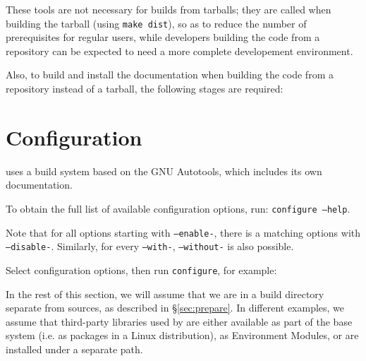 \documentclass[a4paper,10pt,twoside]{csshortdoc}
\begin{document}
These tools are not necessary for builds from tarballs; they
are called when building the tarball (using {\tt make dist}), so
as to reduce the number of prerequisites for regular users, while
developers building the code from a repository can be expected to
need a more complete developement environment.

Also, to build and install the documentation when building the code
from a repository instead of a tarball, the following stages are required:


\section{Configuration\label{sec:config}}

\CS uses a build system based on the GNU Autotools, which includes
its own documentation.

To obtain the full list of available configuration options,
run: {\tt configure~--help}.

Note that for all options starting with {\tt --enable-},
there is a matching options with {\tt --disable-}. Similarly,
for every {\tt --with-}, {\tt --without-} is also possible.

Select configuration options, then run {\tt configure}, for example:


In the rest of this section, we will assume that we are in
a build directory separate from sources, as described in
\S\ref{sec:prepare}. In different examples, we assume
that third-party libraries used by \CS are either available
as part of the base system (i.e. as packages in a Linux distribution),
as Environment Modules, or are installed under a separate path.
\end{document}
